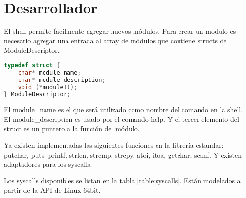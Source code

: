 \documentclass{article}
\begin{document}
\section *{Desarrollador}

El shell permite facilmente agregar nuevos módulos. Para crear un modulo es necesario agregar una entrada al array de módulos que contiene structs de ModuleDescriptor.

\begin{lstlisting}[language=C]
typedef struct {
    char* module_name;
    char* module_description;
    void (*module)();
} ModuleDescriptor;
\end{lstlisting}

El module\_name es el que será utilizado como nombre del comando en la shell. El module\_description es usado por el comando help. Y el tercer elemento del struct es un puntero a la función del módulo.

Ya existen implementadas las siguientes funciones en la librería estandar: putchar, puts, printf, strlen, strcmp, strcpy, atoi, itoa, getchar, scanf. Y existen adaptadores para los syscalls.

Los syscalls disponibles se listan en la tabla \ref{table:syscalls}. Están modelados a partir de la API de Linux 64bit.
\end{document}
